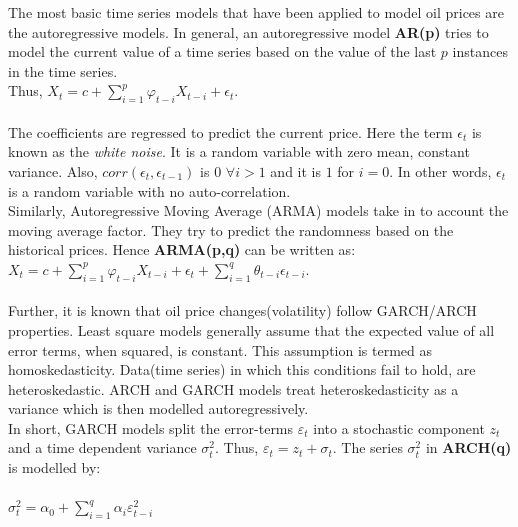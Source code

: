 \documentclass[runningheads]{llncs}
\begin{document}
\noindent The most basic time series models that have been applied to model oil prices are the autoregressive models. In general, an autoregressive model \textbf{AR(p)} tries to model the current value of a time series based on the value of the last $p$ instances in the time series.\\

\noindent Thus, $ X_{t} = c + \sum\limits_{i=1}^p \varphi_{t-i}X_{t-i} + \epsilon_{t}$.\\\\

\noindent The coefficients are regressed to predict the current price. Here the term $\epsilon_{t}$ is known as the \textit{white noise}. It is a random variable with zero mean, constant variance. Also, $corr(\epsilon_t,\epsilon_{t-1})$ is $0$ $\forall i>1$ and it is $1$ for $i=0$. In other words, $\epsilon_{t}$ is a random variable with no auto-correlation.\\

\noindent Similarly, Autoregressive Moving Average (ARMA) models take in to account the moving average factor. They try to predict the randomness based on the historical prices.  Hence \textbf{ARMA(p,q)} can be written as:\\

$ X_{t} = c + \sum\limits_{i=1}^p \varphi_{t-i}X_{t-i} + \epsilon_{t} + \sum\limits_{i=1}^q \theta_{t-i}\epsilon_{t-i}$.\\
\\

\noindent Further, it is known that oil price changes(volatility) follow GARCH/ARCH properties. Least square models generally assume that the expected value of all error terms, when squared, is constant. This assumption is termed as homoskedasticity. Data(time series) in which this conditions fail to hold, are heteroskedastic. ARCH and GARCH models treat heteroskedasticity as a variance which is then modelled autoregressively.\cite{engle}\\

\noindent In short, GARCH models split the error-terms $\varepsilon_t$ into a stochastic component $z_{t}$ and a time dependent variance $\sigma^2_{t}$. Thus, $ \varepsilon_t = z_{t} + \sigma_{t}$. The series $\sigma^2_{t}$ in \textbf{ARCH(q)} is modelled by:\\\\

$\sigma^2_{t} = \alpha_{0} + \sum\limits_{i=1}^q \alpha_{i}\varepsilon_{t-i}^2 $\\\\
\end{document}
